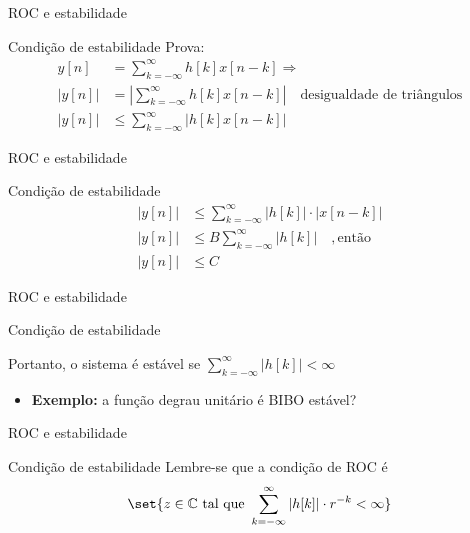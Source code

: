 \begin{frame}{ROC e estabilidade}
\begin{block}{Condição de estabilidade}
	Prova:
	\begin{align*}
	y[n]&=\sum_{k=-\infty}^{\infty}h[k]x[n-k]\Rightarrow\\
	|y[n]|&=\left| \sum_{k=-\infty}^{\infty}h[k]x[n-k] \right| \quad \text{desigualdade de triângulos}\\
	|y[n]|&\leqslant \sum_{k=-\infty}^{\infty}\left|h[k]x[n-k] \right|
	\end{align*}
	
	
\end{block}
\end{frame}

\begin{frame}{ROC e estabilidade}
\begin{block}{Condição de estabilidade}
	\begin{align*}
	|y[n]|&\leqslant \sum_{k=-\infty}^{\infty}\left|h[k]\right| \cdot \left| x[n-k] \right|\\
	|y[n]|&\leqslant B \sum_{k=-\infty}^{\infty}\left|h[k]\right| \quad , \text{então}\\
	|y[n]|&\leqslant C
	\end{align*}
	\QEDB
	
\end{block}
\end{frame}

\begin{frame}{ROC e estabilidade}
\begin{block}{Condição de estabilidade}
	
	Portanto, o sistema é estável se $ \displaystyle\sum_{k=-\infty}^{\infty}|h[k]|<\infty $

\begin{itemize}
    \item \textbf{Exemplo:} a função degrau unitário é BIBO estável?
\end{itemize}

\end{block}
\end{frame}

\begin{frame}{ROC e estabilidade}
\begin{block}{Condição de estabilidade}
	Lembre-se que a condição de ROC é \[ \set{z\in\mathbb{C} \text{ tal que } \displaystyle\sum_{k=-\infty}^{\infty}|h[k]|\cdot r^{-k}<\infty}  \]
\end{block}
\end{frame}

